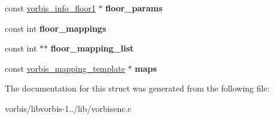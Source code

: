 \begin{DoxyCompactItemize}
\item 
\hypertarget{structve__setup__data__template_aad9d08b4c6963f216ab062c84c033ed1}{const \hyperlink{structvorbis__info__floor1}{vorbis\+\_\+info\+\_\+floor1} $\ast$ {\bfseries floor\+\_\+params}}\label{structve__setup__data__template_aad9d08b4c6963f216ab062c84c033ed1}

\item 
\hypertarget{structve__setup__data__template_aeef323dc0bb8a405c9a0eba0e41b6453}{const int {\bfseries floor\+\_\+mappings}}\label{structve__setup__data__template_aeef323dc0bb8a405c9a0eba0e41b6453}

\item 
\hypertarget{structve__setup__data__template_a3251bd75c47300d53a68cdab42052df6}{const int $\ast$$\ast$ {\bfseries floor\+\_\+mapping\+\_\+list}}\label{structve__setup__data__template_a3251bd75c47300d53a68cdab42052df6}

\item 
\hypertarget{structve__setup__data__template_ac7dcf3e49171d4960559c4cb32d08786}{const \hyperlink{structvorbis__mapping__template}{vorbis\+\_\+mapping\+\_\+template} $\ast$ {\bfseries maps}}\label{structve__setup__data__template_ac7dcf3e49171d4960559c4cb32d08786}

\end{DoxyCompactItemize}


The documentation for this struct was generated from the following file\+:\begin{DoxyCompactItemize}
\item 
vorbis/libvorbis-\/1../lib/vorbisenc.\+c\end{DoxyCompactItemize}
